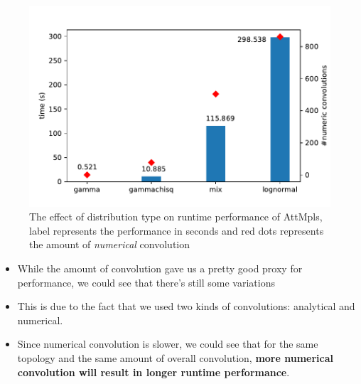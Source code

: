 \documentclass[10pt,sigconf,letterpaper,anonymous,nonacm]{acmart}
\begin{document}
\begin{figure}[h]
    \centering
    \includegraphics[scale=0.5]{distribution}
    \caption{The effect of distribution type on runtime performance of AttMpls, label represents the 
    performance in seconds and red dots represents the amount of \textit{numerical} convolution}
    \label{fig:dist}
\end{figure}

\begin{itemize}
    \item While the amount of convolution gave us a pretty good proxy for performance, we could see 
        that there's still some variations
    \item This is due to the fact that we used two kinds of convolutions: analytical and numerical.
    \item Since numerical convolution is slower, we could see that for the same topology and the same amount of 
        overall convolution, \textbf{more numerical convolution will result in longer runtime performance}.
\end{itemize}


\end{document}
